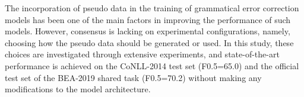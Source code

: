 The incorporation of pseudo data in the training of grammatical error correction models has been one of the main factors in improving the performance of such models.
However, consensus is lacking on experimental configurations, namely, choosing how the pseudo data should be generated or used. 
In this study, these choices are investigated through extensive experiments, and state-of-the-art performance is achieved on the CoNLL-2014 test set (F0.5=65.0) and the official test set of the BEA-2019 shared task (F0.5=70.2) without making any modifications to the model architecture.